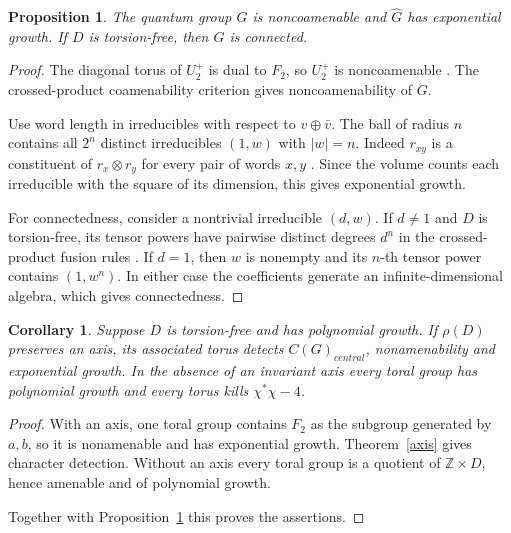 \documentclass[11pt,a4paper]{article}
\newtheorem{prop}[thm]{Proposition}
\newtheorem{cor}[thm]{Corollary}
\theoremstyle{remark}
\begin{document}
\begin{prop}\label{ambient}
The quantum group $G$ is noncoamenable and $\widehat G$ has exponential
growth. If $D$ is torsion-free, then $G$ is connected.
\end{prop}
\begin{proof}
The diagonal torus of $U_2^+$ is dual to $F_2$, so $U_2^+$ is
noncoamenable \cite{bp}. The crossed-product coamenability criterion
\cite[Corollary~6.4]{fmp} gives noncoamenability of $G$.

Use word length in irreducibles with respect to $v\oplus\bar v$. The ball
of radius $n$ contains all $2^n$ distinct irreducibles $(1,w)$ with
$|w|=n$. Indeed $r_{xy}$ is a constituent of $r_x\otimes r_y$ for every
pair of words $x,y$ \cite[Theorem~6.20]{qg}. Since the volume counts each irreducible
with the square of its dimension, this gives exponential growth.

For connectedness, consider a nontrivial irreducible $(d,w)$. If $d\ne1$
and $D$ is torsion-free, its tensor powers have pairwise distinct degrees
$d^n$ in the crossed-product fusion rules \cite[Remark~6.3]{fmp}. If $d=1$,
then $w$ is nonempty and its $n$-th tensor power contains $(1,w^n)$.
In either case the coefficients generate an infinite-dimensional algebra,
which gives connectedness.
\end{proof}

\begin{cor}\label{three}
Suppose $D$ is torsion-free and has polynomial growth. If $\rho(D)$
preserves an axis, its associated torus detects $C(G)_{central}$, nonamenability
and exponential growth. In the absence of an invariant axis every
toral group has polynomial growth and every torus kills $\chi^*\chi-4$.
\end{cor}
\begin{proof}
With an axis, one toral group contains $F_2$ as the subgroup generated by
$a,b$, so it is nonamenable and has exponential growth. Theorem~\ref{axis}
gives character detection. Without an axis every toral group is a quotient
of $\mathbb Z\times D$, hence amenable and of polynomial growth.

Together with Proposition~\ref{ambient} this proves the assertions.
\end{proof}
\end{document}
